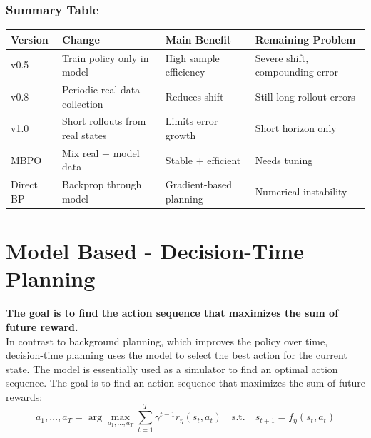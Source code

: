 \documentclass[12pt]{article}
\begin{document}
\subsubsection*{Summary Table}
\begin{center}
\begin{tabular}{|l|l|l|l|}
\hline
\textbf{Version} & \textbf{Change} & \textbf{Main Benefit} & \textbf{Remaining Problem} \\
\hline
v0.5 & Train policy only in model & High sample efficiency & Severe shift, compounding error \\
v0.8 & Periodic real data collection & Reduces shift & Still long rollout errors \\
v1.0 & Short rollouts from real states & Limits error growth & Short horizon only \\
MBPO & Mix real + model data & Stable + efficient & Needs tuning \\
Direct BP & Backprop through model & Gradient-based planning & Numerical instability \\
\hline
\end{tabular}
\end{center}




\section{Model Based - Decision-Time Planning}
\textbf{The goal is to find the action sequence that maximizes the sum of future reward.
}\\
In contrast to background planning, which improves the policy over time, decision-time planning uses the model to select the best action for the current state. The model is essentially used as a simulator to find an optimal action sequence. The goal is to find an action sequence that maximizes the sum of future rewards:
$$ a_1, \dots, a_T = \arg\max_{a_1,\dots,a_T} \sum_{t=1}^T \gamma^{t-1} r_\eta(s_t, a_t) \quad \text{s.t.} \quad s_{t+1} = f_\eta(s_t, a_t) $$
\end{document}
